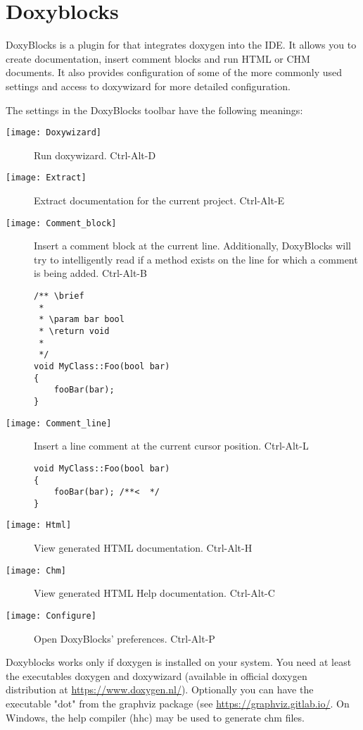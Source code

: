 \section{Doxyblocks}\label{sec:doxyblocks}

DoxyBlocks is a plugin for \codeblocks that integrates doxygen into the IDE. It allows you to create documentation, insert comment blocks and run HTML or CHM documents. It also provides configuration of some of the more commonly used settings and access to doxywizard for more detailed configuration.

The settings in the DoxyBlocks toolbar have the following meanings:

\begin{description}
\item[\texttt{[image: Doxywizard]}] Run doxywizard. Ctrl-Alt-D
\item[\texttt{[image: Extract]}] Extract documentation for the current project. Ctrl-Alt-E
\item[\texttt{[image: Comment\_block]}] Insert a comment block at the current line. Additionally, DoxyBlocks will try to intelligently read if a method exists on the line for which a comment is being added. Ctrl-Alt-B

\begin{lstlisting}
/** \brief
 *
 * \param bar bool
 * \return void
 *
 */    
void MyClass::Foo(bool bar)
{
    fooBar(bar);
}
\end{lstlisting}

\item[\texttt{[image: Comment\_line]}] Insert a line comment at the current cursor position. Ctrl-Alt-L
\begin{lstlisting}
void MyClass::Foo(bool bar)
{
    fooBar(bar); /**<  */
}
\end{lstlisting}

\item[\texttt{[image: Html]}] View generated HTML documentation. Ctrl-Alt-H
\item[\texttt{[image: Chm]}] View generated HTML Help documentation. Ctrl-Alt-C
\item[\texttt{[image: Configure]}] Open DoxyBlocks' preferences. Ctrl-Alt-P
\end{description}

Doxyblocks works only if doxygen is installed on your system. You need at least the executables doxygen and doxywizard (available in official doxygen distribution at \url{https://www.doxygen.nl/}). Optionally you can have the executable "dot" from the graphviz package (see \url{https://graphviz.gitlab.io/}. On Windows, the help compiler (hhc) may be used to generate chm files.

